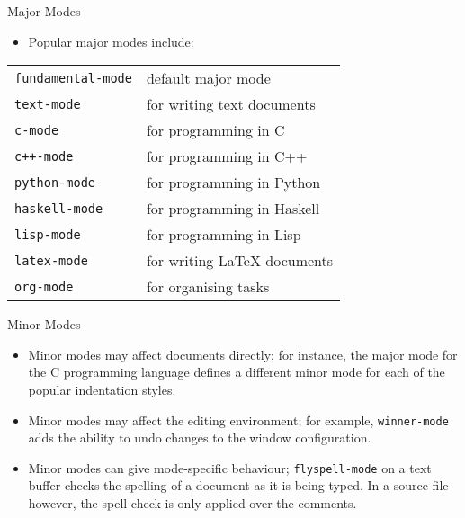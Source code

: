 \documentclass[12pt,a4paper,oneside]{beamer}
\begin{document}
\begin{frame}{Major Modes}
\begin{itemize}
  \item Popular major modes include:
\end{itemize}
\begin{multicols}
  \begin{tabular}{@{}ll@{}}
    \texttt{fundamental-mode} & default major mode\\
    \texttt{text-mode} & for writing text documents\\
    \texttt{c-mode} & for programming in C\\
    \texttt{c++-mode} & for programming in C++\\
    \texttt{python-mode} & for programming in Python\\
    \texttt{haskell-mode} & for programming in Haskell\\
    \texttt{lisp-mode} & for programming in Lisp\\
    \texttt{latex-mode} & for writing {\LaTeX} documents\\
    \texttt{org-mode} & for organising tasks
  \end{tabular}
\end{multicols}
\end{frame}

\begin{frame}{Minor Modes}
\begin{itemize}
  \item Minor modes may affect documents directly; for instance, the major mode for the C programming language defines a different minor mode for each of the popular indentation styles.\newline
  \item Minor modes may affect the editing environment; for example, \texttt{winner-mode} adds the ability to undo changes to the window configuration.\newline
  \item Minor modes can give mode-specific behaviour; \texttt{flyspell-mode} on a text buffer checks the spelling of a document as it is being typed. In a source file however, the spell check is only applied over the comments.
\end{itemize}
\end{frame}
\end{document}
